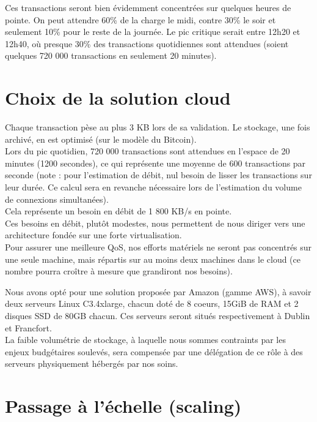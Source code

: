 Ces transactions seront bien évidemment concentrées sur quelques heures de pointe.
On peut attendre 60\% de la charge le midi, contre 30\% le soir et seulement 10\%
pour le reste de la journée. Le pic critique serait entre 12h20 et 12h40, où
presque 30\% des transactions quotidiennes sont attendues (soient quelques
720 000 transactions en seulement 20 minutes).

\section{Choix de la solution cloud}
\label{sec:choix-solution-cloud}

Chaque transaction pèse au plus 3 KB lors de sa validation. Le stockage,
une fois archivé, en est optimisé (sur le modèle du Bitcoin). \\

Lors du pic quotidien, 720 000 transactions sont attendues en l'espace de 20
minutes (1200 secondes), ce qui représente une moyenne de 600 transactions
par seconde (note : pour l'estimation de débit, nul besoin de lisser les
transactions sur leur durée. Ce calcul sera en revanche nécessaire lors
de l'estimation du volume de connexions simultanées). \\

Cela représente un besoin en débit de 1 800 KB/s en pointe. \\

Ces besoins en débit, plutôt modestes, nous permettent de nous diriger
vers une architecture fondée sur une forte virtualisation. \\

Pour assurer une meilleure QoS, nos efforts matériels ne seront pas concentrés
sur une seule machine, mais répartis sur au moins deux machines dans le cloud
(ce nombre pourra croître à mesure que grandiront nos besoins).

Nous avons opté pour une solution proposée par Amazon (gamme AWS), à savoir deux
serveurs Linux C3.4xlarge, chacun doté de 8 coeurs, 15GiB de RAM et 2 disques SSD
de 80GB chacun. Ces serveurs seront situés respectivement à Dublin et Francfort. \\

La faible volumétrie de stockage, à laquelle nous sommes contraints par les
enjeux budgétaires soulevés, sera compensée par une délégation de ce rôle à
des serveurs physiquement hébergés par nos soins.

\section{Passage à l'échelle (scaling)}
\label{sec:scaling}


